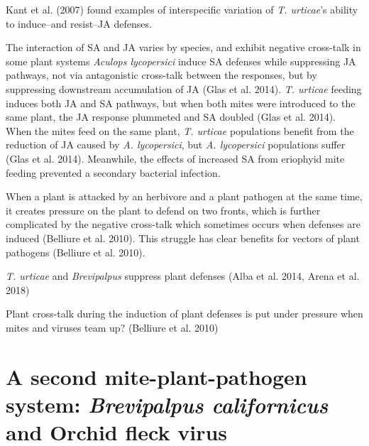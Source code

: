 \documentclass[12pt,final,CPage]{ufthesis}
\begin{document}
{  Kant et al. (2007) found examples of interspecific variation of \emph{T. urticae}'s ability to induce--and resist--JA defenses.

  The interaction of SA and JA varies by species, and exhibit negative cross-talk in some plant systems
  \emph{Aculops lycopersici} induce SA defenses while suppressing JA pathways, not via antagonistic cross-talk between the responses, but by suppressing downstream accumulation of JA (Glas et al. 2014). \emph{T. urticae} feeding induces both JA and SA pathways, but when both mites were introduced to the same plant, the JA response plummeted and SA doubled (Glas et al. 2014). When the mites feed on the same plant, \emph{T. urticae} populations benefit from the reduction of JA caused by \emph{A. lycopersici}, but \emph{A. lycopersici} populations suffer (Glas et al. 2014). Meanwhile, the effects of increased SA from eriophyid mite feeding prevented a secondary bacterial infection.

  When a plant is attacked by an herbivore and a plant pathogen at the same time, it creates pressure on the plant to defend on two fronts, which is further complicated by the negative cross-talk which sometimes occurs when defenses are induced (Belliure et al. 2010). This struggle has clear benefits for vectors of plant pathogens (Belliure et al. 2010).

  \emph{T. urticae} and \emph{Brevipalpus} suppress plant defenses (Alba et al. 2014, Arena et al. 2018)

  Plant cross-talk during the induction of plant defenses is put under pressure when mites and viruses team up? (Belliure et al. 2010)

  \hypertarget{bcali-litrev}{%
  \section{\texorpdfstring{A second mite-plant-pathogen system: \emph{Brevipalpus californicus} and Orchid fleck virus}{A second mite-plant-pathogen system: Brevipalpus californicus and Orchid fleck virus}}\label{bcali-litrev}}

}
\end{document}
